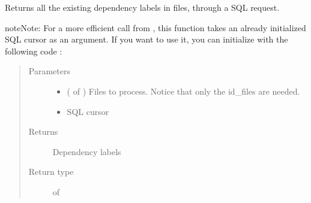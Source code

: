 \documentclass[letterpaper,10pt,english]{sphinxmanual}
\begin{document}

\begin{fulllineitems}
\label{\detokenize{analysis:loacore.analysis.frequencies.get_label_set}}
Returns all the existing dependency labels in files, through a SQL request.

\begin{sphinxadmonition}{note}{Note:}
For a more efficient call from {\hyperref[\detokenize{analysis:loacore.analysis.frequencies.label_frequencies}]{}}, this function takes an already initialized SQL
cursor as an argument.
If you want to use it, you can initialize  with the following code :

%
\begin{sphinxVerbatim}[commandchars=\\\{\}]
   
   
  
  
\end{sphinxVerbatim}
\end{sphinxadmonition}
\begin{quote}\begin{description}
\item[{Parameters}] \leavevmode\begin{itemize}
\item {} 
 ( of ) \textendash{} Files to process. Notice that only the id\_files are needed.

\item {} 
 \textendash{} SQL cursor

\end{itemize}

\item[{Returns}] \leavevmode
Dependency labels

\item[{Return type}] \leavevmode
{} of 

\end{description}\end{quote}

\end{fulllineitems}
\end{document}
